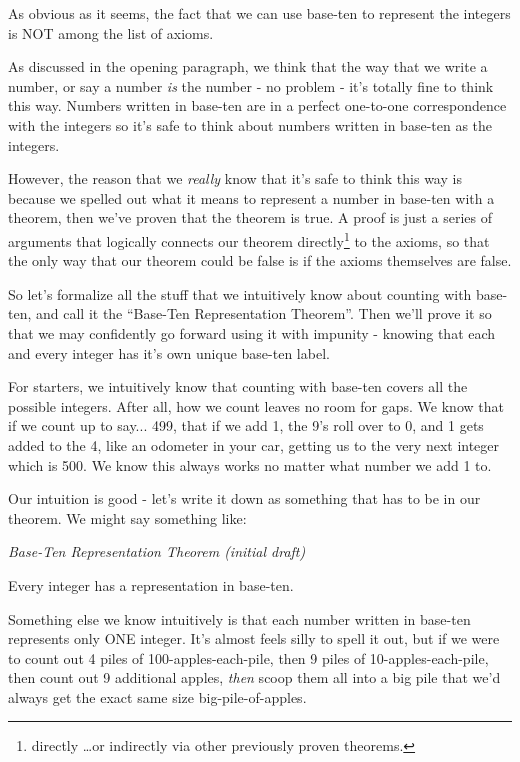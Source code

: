 \documentclass{article}
\newenvironment{jprIn}{\begin{adjustwidth}{2em}{}}{\end{adjustwidth}}
\begin{document}
As obvious as it seems, the fact that
we can use base-ten to represent the integers is NOT among the list of axioms.

As discussed in the opening paragraph, we think that the way
that we write a number, or say a number \emph{is} the number - no
problem - it's totally fine to think this way.
Numbers written in base-ten are in
a perfect one-to-one correspondence with the integers so
it's safe to think about numbers written 
in base-ten as the integers.

However, the reason that we \emph{really} know that it's safe to think this way is because we 
spelled out what it means to represent a number in base-ten with 
a theorem, then we've proven that the theorem is true.
A proof
is just a series of arguments that logically connects our theorem
directly\footnote{directly \dots{}or indirectly
via other previously proven theorems.} to the axioms, so that the only way
that our theorem could be false is if the axioms themselves are false.

So let's formalize all the stuff that we intuitively know about
counting with base-ten, and call it the ``Base-Ten Representation Theorem''.
Then we'll prove it so that we may confidently go forward using it with
impunity - knowing that each and every integer has it's own unique base-ten label.

For starters, we intuitively know that counting with
base-ten covers all the possible integers.
After all, how we count leaves no room for gaps.
We know that if we count up to say... 499,
that if we add 1, the 9's roll over to 0,
and 1 gets added to the 4, like an odometer in your car,
getting us to the very next integer which is 500.
We know this always works no matter what number we add 1 to.

Our intuition is good - let's write it down as something that has to be
in our theorem. We might say something like:

\emph{Base-Ten Representation Theorem (initial draft)}
\begin{jprIn}
Every integer has a representation in base-ten.
\end{jprIn}

\bigskip
Something else we know intuitively is that each number written
in base-ten represents only ONE integer.
It's almost feels silly to spell it out, but if we were to count out
4 piles of 100-apples-each-pile, then 9 piles of 10-apples-each-pile,
then count out 9 additional apples, \emph{then}
scoop them all into a big pile that
we'd always get the exact same size big-pile-of-apples.
\end{document}
